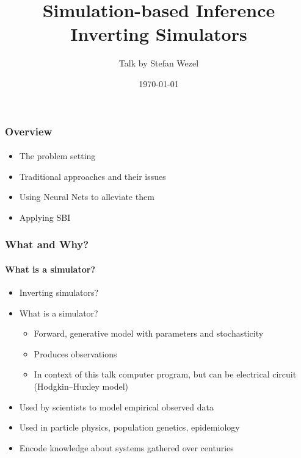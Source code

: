 \documentclass[9pt]{beamer}
\title{Simulation-based Inference \\
	\small Inverting Simulators}
\author{Talk by Stefan Wezel}
\institute{mlcolab @ Tübingen University Cluster of Excellence}
\date{\today}
\begin{document}
	

\begin{frame}[plain]
	\titlepage
\end{frame} 



\begin{frame}
\frametitle{Overview}
\framesubtitle{}
\begin{itemize}
	\item The problem setting %
	\item Traditional approaches and their issues
	\item Using Neural Nets to alleviate them
	\item Applying SBI
\end{itemize}
\end{frame} 






\begin{frame}
\frametitle{What and Why?}
\framesubtitle{What is a simulator?}
\begin{itemize}
	\item Inverting simulators?%
	\item What is a simulator? %
	\begin{itemize}
		\item Forward, generative model with parameters and stochasticity
		\item Produces observations
		\item In context of this talk computer program, but can be electrical circuit (Hodgkin–Huxley model)
	\end{itemize}
	\item Used by scientists to model empirical observed data
	\item Used in particle physics, population genetics, epidemiology
	\item Encode knowledge about systems gathered over centuries
\end{itemize}
\end{frame} 
\end{document}
